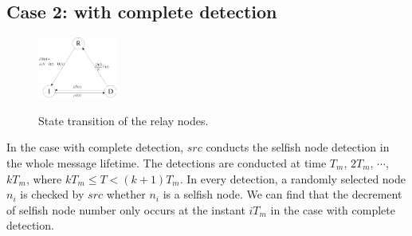 \subsection{Case 2: with complete detection}
\label{subsec:full_detc}
\begin{figure}
  \centering
  {\includegraphics[width=0.23\textwidth]
  {fig/state_transition_detect.eps}}
     \caption{State transition of the relay nodes.}
     \label{fig:ss_dt}
\end{figure}
In the case with complete detection,
$src$ conducts the selfish node detection in the whole message lifetime.
The detections are conducted at
time {$T_{m}$, $2 T_{m}$, $\cdots$, $k T_{m}$},
where $k T_{m} \le T < (k+1) T_{m}$.
In every detection, a randomly selected node $n_{i}$
is checked by $src$ whether $n_{i}$ is a selfish node.
We can find that the decrement of selfish node number
only occurs at the instant $iT_{m}$
in the case with complete detection.


